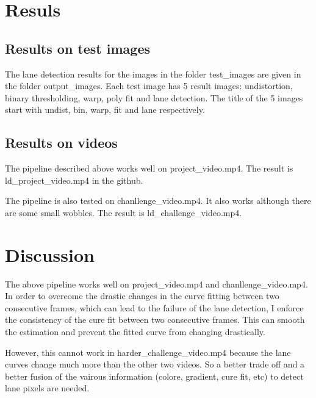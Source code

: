\documentclass[12pt]{article}
\begin{document}
\section{Resuls}
\subsection{Results on test images}
The lane detection results for the images in the folder test\_images are given in the folder output\_images. Each test image has 5 result images: undistortion, binary thresholding, warp, poly fit and lane detection. The title of the 5 images start with undist, bin, warp, fit and lane respectively.

\subsection{Results on videos}
The pipeline described above works well on project\_video.mp4. The result is ld\_project\_video.mp4 in the github.

The pipeline is also tested on chanllenge\_video.mp4. It also works although there are some small wobbles. The result is ld\_challenge\_video.mp4.


\section{Discussion}
The above pipeline works well on project\_video.mp4 and chanllenge\_video.mp4. In order to overcome the drastic changes in the curve fitting between two consecutive frames, which can lead to the failure of the lane detection, I enforce the consistency of the cure fit between two consecutive frames. This can smooth the estimation and prevent the fitted curve from changing drastically. 

However, this cannot work in harder\_challenge\_video.mp4 because the lane curves change much more than the other two videos. So a better trade off and a better fusion of the vairous information (colore, gradient, cure fit, etc) to detect lane pixels are needed. 
\end{document}

